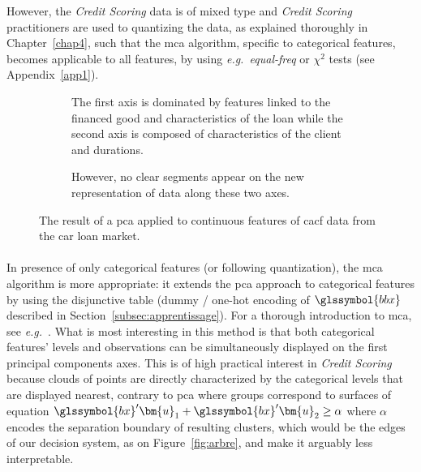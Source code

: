 However, the \textit{Credit Scoring} data is of mixed type and \textit{Credit Scoring} practitioners are used to quantizing the data, as explained thoroughly in Chapter~\ref{chap4}, such that the \gls{mca} algorithm, specific to categorical features, becomes applicable to all features, by using \textit{e.g.\ equal-freq} or $\chi^2$ tests (see Appendix~\ref{app1}).

\begin{figure}[!htb]
{\setlength{\parindent}{0cm}}
\begin{multicols}{2}
\centering
\begin{subfigure}[t]{0.45\textwidth}
\centering
\resizebox{\textwidth}{!}{}
\caption{\label{fig:pca1} The first axis is dominated by features linked to the financed good and characteristics of the loan while the second axis is composed of characteristics of the client and durations.}
\end{subfigure}%
\columnbreak
\hspace*{1cm} \begin{subfigure}[t]{0.45\textwidth}
\centering
\resizebox{\textwidth}{!}{}
\caption{\label{fig:pca2} However, no clear segments appear on the new representation of data along these two axes.}
\end{subfigure}
\end{multicols}
\caption{\label{fig:pca} The result of a \gls{pca} applied to continuous features of \gls{cacf} data from the car loan market.}
\end{figure}

\paragraph{}

In presence of only categorical features (or following quantization), the \gls{mca} algorithm is more appropriate: it extends the \gls{pca} approach to categorical features by using the disjunctive table (dummy / one-hot encoding of $\glssymbol{bbx}$ described in Section~\ref{subsec:apprentissage}). For a thorough introduction to \gls{mca}, see \textit{e.g.}~\cite{lebart1995statistique}. What is most interesting in this method is that both categorical features' levels and observations can be simultaneously displayed on the first principal components axes.
This is of high practical interest in \textit{Credit Scoring} because clouds of points are directly characterized by the categorical levels that are displayed nearest, contrary to \gls{pca} where groups correspond to surfaces of equation $\glssymbol{bx} ' \bm{u}_1 + \glssymbol{bx} ' \bm{u}_2 \geq \alpha$ where $\alpha$ encodes the separation boundary of resulting clusters, which would be the edges of our decision system, as on Figure~\ref{fig:arbre}, and make it arguably less interpretable.

